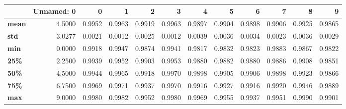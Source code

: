 \begin{tabular}{lrrrrrrrrrrr}
\toprule
{} &  Unnamed: 0 &       0 &       1 &       2 &       3 &       4 &       5 &       6 &       7 &       8 &       9 \\
\midrule
\textbf{mean} &      4.5000 &  0.9952 &  0.9963 &  0.9919 &  0.9963 &  0.9897 &  0.9904 &  0.9898 &  0.9906 &  0.9925 &  0.9865 \\
\textbf{std } &      3.0277 &  0.0021 &  0.0012 &  0.0025 &  0.0012 &  0.0039 &  0.0036 &  0.0034 &  0.0023 &  0.0036 &  0.0029 \\
\textbf{min } &      0.0000 &  0.9918 &  0.9947 &  0.9874 &  0.9941 &  0.9817 &  0.9832 &  0.9823 &  0.9883 &  0.9867 &  0.9822 \\
\textbf{25\% } &      2.2500 &  0.9939 &  0.9952 &  0.9903 &  0.9953 &  0.9880 &  0.9882 &  0.9880 &  0.9886 &  0.9908 &  0.9851 \\
\textbf{50\% } &      4.5000 &  0.9944 &  0.9965 &  0.9918 &  0.9970 &  0.9898 &  0.9905 &  0.9906 &  0.9898 &  0.9923 &  0.9866 \\
\textbf{75\% } &      6.7500 &  0.9969 &  0.9971 &  0.9937 &  0.9970 &  0.9916 &  0.9927 &  0.9916 &  0.9920 &  0.9946 &  0.9889 \\
\textbf{max } &      9.0000 &  0.9980 &  0.9982 &  0.9952 &  0.9980 &  0.9969 &  0.9955 &  0.9937 &  0.9951 &  0.9990 &  0.9901 \\
\bottomrule
\end{tabular}
